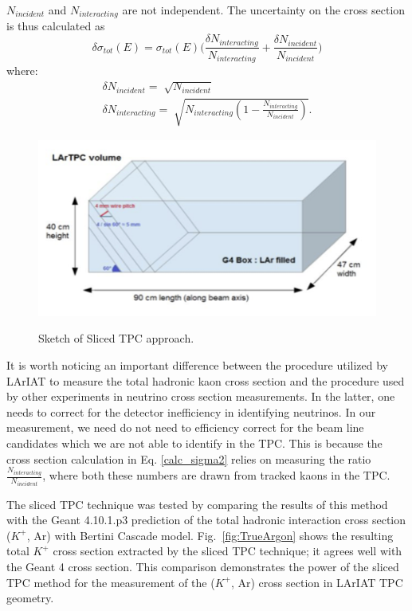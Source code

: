 $N_{incident}$ and $N_{interacting}$ are not independent.
The uncertainty on the cross section is thus calculated as 
\begin{equation}
\delta\sigma_{tot}(E) = \sigma_{tot}(E) \Big(\frac{\delta N_{interacting}}{N_{interacting}}+\frac{\delta N_{incident}}{N_{incident}}\Big) 
\end{equation}
where:
\begin{eqnarray}
\delta N_{incident} = \sqrt[]{N_{incident}} \\
\delta N_{interacting} = \sqrt[]{N_{interacting}(1-\frac{ N_{interacting}}{N_{incident}})}.
\end{eqnarray}

\begin{figure}[htpb]
\centering
\includegraphics[scale=1.25]{images/Lariat/SlicedTPC.png}\\
\caption{Sketch of Sliced TPC approach.}
\label{fig:slicedtpc}
\end{figure}

It is worth noticing an important difference between the procedure utilized by LArIAT to measure the total hadronic kaon cross section and the procedure used by other experiments in neutrino cross section measurements. In the latter, one needs to correct for the detector inefficiency in identifying neutrinos. In our measurement,  we need do not need to efficiency correct for the beam line candidates which we are not able to identify in the TPC. This is because the cross section calculation in Eq. \ref{calc_sigma2}  relies on measuring the ratio $\frac{ N_{interacting}}{N_{incident}}$, where both these numbers are drawn from tracked kaons in the TPC.

The sliced TPC technique was tested by comparing the results of this method with the Geant 4.10.1.p3 prediction of the total hadronic interaction cross section ($K^{+}$, Ar)  with Bertini Cascade model.
Fig.~\ref{fig:TrueArgon} shows the resulting total ${K^+}$ cross section extracted by the sliced TPC technique; it agrees well with the Geant 4  cross section.  This comparison demonstrates the power of the sliced TPC method for the measurement of the ($K^{+}$, Ar) cross section in LArIAT TPC geometry. 

